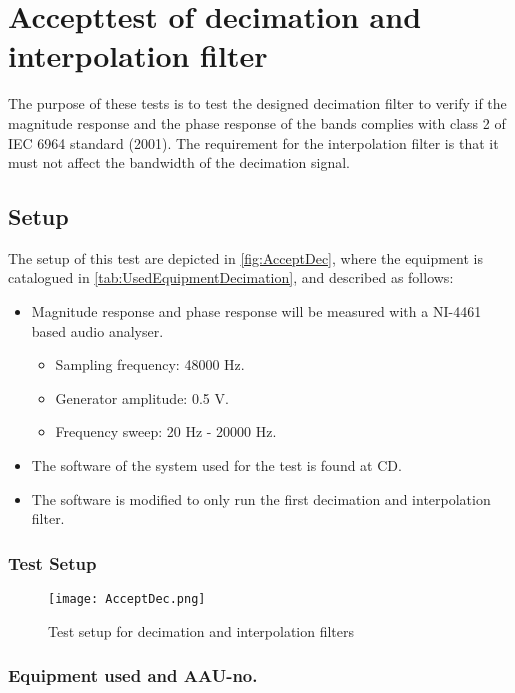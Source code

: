 \chapter{Accepttest of decimation and interpolation filter}\label{app:journal_decimationFilter}
The purpose of these tests is to test the designed decimation filter to verify if the magnitude response and the phase response of the bands complies with class 2 of IEC 6964 standard (2001). The requirement for the interpolation filter is that it must not affect the bandwidth of the decimation signal.


\section{Setup}
The setup of this test are depicted in \autoref{fig:AcceptDec}, where the equipment is catalogued in \autoref{tab:UsedEquipmentDecimation}, and described as follows:

\begin{itemize}\addtolength{\itemsep}{-.35\baselineskip} 
\item Magnitude response and phase response will be measured with a NI-4461 based audio analyser. 
\begin{itemize}\addtolength{\itemsep}{-.35\baselineskip} 
\item Sampling frequency: 48000 Hz.
\item Generator amplitude: 0.5 V.
\item Frequency sweep: 20 Hz - 20000 Hz.
\end{itemize}
\item The software of the system used for the test is found at CD. 
\item The software is modified to only run the first decimation and interpolation filter.
\end{itemize}


\subsection*{Test Setup}
\begin{figure}[H]
\centering
\texttt{[image: AcceptDec.png]}
\caption{Test setup for decimation and interpolation filters}
\label{fig:AcceptDec}
\end{figure}

\subsection*{Equipment used and AAU-no.}

